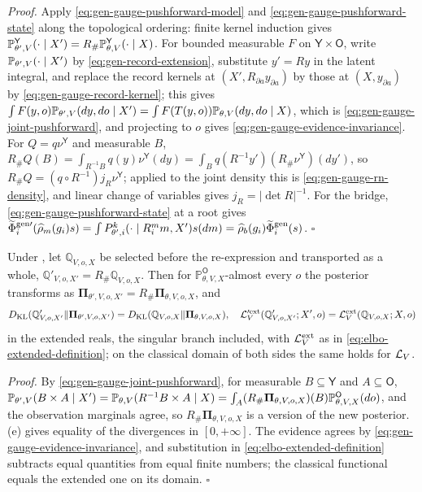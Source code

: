 \noindent\emph{Proof.}
Apply \eqref{eq:gen-gauge-pushforward-model} and \eqref{eq:gen-gauge-pushforward-state} along the
topological ordering: finite kernel induction gives
$\mathbb P_{\theta',V}^{\mathsf Y}(\cdot\mid X')=R_\#\mathbb P_{\theta,V}^{\mathsf Y}(\cdot\mid X)$. For bounded
measurable $F$ on $\mathsf Y\times\mathsf O$, write $\mathbb P_{\theta',V}(\cdot\mid X')$ by
\eqref{eq:gen-record-extension}, substitute $y'=Ry$ in the latent integral, and replace the record kernels
at $(X',R_{\partial a}y_{\partial a})$ by those at $(X,y_{\partial a})$ by \eqref{eq:gen-gauge-record-kernel};
this gives $\int F(y,o)\mathbb P_{\theta',V}(dy,do\mid X')=\int F(T(y,o))\mathbb P_{\theta,V}(dy,do\mid X)$,
which is \eqref{eq:gen-gauge-joint-pushforward}, and projecting to $o$ gives
\eqref{eq:gen-gauge-evidence-invariance}.
For $Q=q\nu^{\mathsf Y}$ and measurable $B$,
$R_\#Q(B)=\int_{R^{-1}B}q(y)\nu^{\mathsf Y}(dy)=\int_Bq(R^{-1}y')(R_\#\nu^{\mathsf Y})(dy')$, so
$R_\#Q=(q\circ R^{-1})j_R\nu^{\mathsf Y}$; applied to the joint density this is
\eqref{eq:gen-gauge-rn-density}, and linear change of variables gives $j_R=\lvert\det R\rvert^{-1}$. For the
bridge, \eqref{eq:gen-gauge-pushforward-state} at a root gives
$\widetilde\Phi^{\mathrm{gen}\prime}_i(\widehat\rho_m(g_i)s)=\int P_{\theta',i}^{k}(\cdot\mid R_i^mm,X')s(dm)
=\widehat\rho_b(g_i)\widetilde\Phi^{\mathrm{gen}}_i(s)$. \hfill$\square$

Under , let $\mathbb Q_{V,o,X}$ be selected before the re-expression and
transported as a whole, $\mathbb Q'_{V,o,X'}=R_\#\mathbb Q_{V,o,X}$. Then for $\mathbb P_{\theta,V,X}^{\mathsf O}$-almost
every $o$ the posterior transforms as $\boldsymbol\Pi_{\theta',V,o,X'}=R_\#\boldsymbol\Pi_{\theta,V,o,X}$, and
\begin{equation}
D_{\mathrm{KL}}(\mathbb Q'_{V,o,X'}\Vert\boldsymbol\Pi_{\theta',V,o,X'})
=D_{\mathrm{KL}}(\mathbb Q_{V,o,X}\Vert\boldsymbol\Pi_{\theta,V,o,X}),
\quad
\mathcal L'^{\mathrm{ext}}_V(\mathbb Q'_{V,o,X'};X',o)=\mathcal L^{\mathrm{ext}}_V(\mathbb Q_{V,o,X};X,o)
\label{eq:elbo-gauge-invariance}
\end{equation}
in the extended reals, the singular branch included, with $\mathcal L^{\mathrm{ext}}_V$ as in
\eqref{eq:elbo-extended-definition}; on the classical domain of both sides the same holds for $\mathcal L_V$.

\noindent\emph{Proof.}
By \eqref{eq:gen-gauge-joint-pushforward}, for measurable $B\subseteq\mathsf Y$ and $A\subseteq\mathsf O$,
$\mathbb P_{\theta',V}(B\times A\mid X')=\mathbb P_{\theta,V}(R^{-1}B\times A\mid X)
=\int_A(R_\#\boldsymbol\Pi_{\theta,V,o,X})(B)\mathbb P^{\mathsf O}_{\theta,V,X}(do)$, and the observation marginals
agree, so $R_\#\boldsymbol\Pi_{\theta,V,o,X}$ is a version of the new posterior. (e)
gives equality of the divergences in $[0,+\infty]$. The evidence agrees by
\eqref{eq:gen-gauge-evidence-invariance}, and substitution in \eqref{eq:elbo-extended-definition} subtracts
equal quantities from equal finite numbers; the classical functional equals the extended one on its domain.
\hfill$\square$

